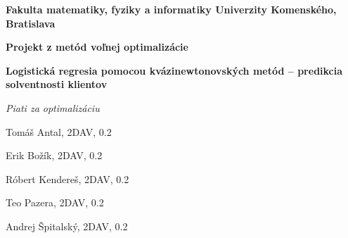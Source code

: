 \documentclass[12pt,oneside,a4paper,slovak]{article}
\begin{document}
	\setcounter{section}{-1}
	\begin{titlepage}
		\large
		
		\begin{center}
			\textbf{Fakulta matematiky, fyziky a informatiky Univerzity Komenského, Bratislava}
			
			\vspace{7.5cm}
			
			\LARGE\textbf{Projekt z metód voľnej optimalizácie}
			
			\vspace{1cm}
			
			\LARGE\textbf{ Logistická regresia pomocou kvázinewtonovských metód -- predikcia solventnosti klientov}
			
			\bigskip 
		\end{center}
			
		\vfill
		
		\hfill
		\begin{minipage}{0.5\textwidth}
			\raggedleft
			
			\textit{Piati za optimalizáciu}
	
			Tomáš Antal, 2DAV, 0.2
			
			Erik Božík, 2DAV, 0.2
			
			Róbert Kendereš, 2DAV, 0.2
			
			Teo Pazera, 2DAV, 0.2
			
			Andrej Špitalský, 2DAV, 0.2
		\end{minipage}
			
	\end{titlepage}
	
	\tableofcontents
	\newpage
	
	
	\newpage
	
	\newpage
	
	\newpage
	
	\newpage
	
	\newpage
	
	\newpage
	
	\newpage
	
	\newpage
	
	\newpage
	
\end{document}
